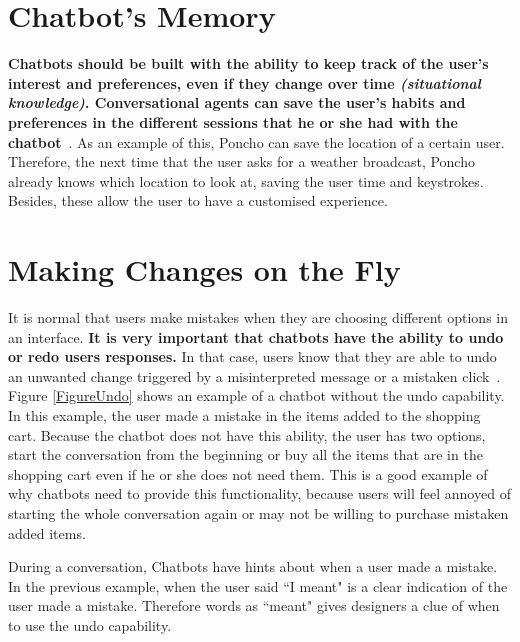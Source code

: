 \documentclass[a4paper,10pt]{article}
\begin{document}
\section{Chatbot's Memory}

\textbf{Chatbots should be built with the ability to keep track of the user's interest and preferences, even if they change over time \textit{(situational knowledge)}. Conversational agents can save the user's habits and preferences in the different sessions that he or she had with the chatbot}~\cite{shneiderman1997direct}. As an example of this, Poncho can save the location of a certain user. Therefore, the next time that the user asks for a weather broadcast, Poncho already knows which location to look at, saving the user time and keystrokes. Besides, these allow the user to have a customised experience. 

\section{Making Changes on the Fly}

It is normal that users make mistakes when they are choosing different options in an interface. \textbf{It is very important that chatbots have the ability to undo or redo users responses.} In that case, users know that they are able to undo an unwanted change triggered by a misinterpreted message or a mistaken click~\cite{HeuristicsWebPage}. %
Figure \ref{FigureUndo} shows an example of a chatbot without the undo capability. In this example, the user made a mistake in the items added to the shopping cart. Because the chatbot does not have this ability, the user has two options, start the conversation from the beginning or buy all the items that are in the shopping cart even if he or she does not need them. This is a good example of why chatbots need to provide this functionality, because users will feel annoyed of starting the whole conversation again or may not be willing to purchase mistaken added items. 

During a conversation, Chatbots have hints about when a user made a mistake. In the previous example, when the user said ``I meant" is a clear indication of the user made a mistake. Therefore words as ``meant" gives designers a clue of when to use the undo capability.
\end{document}
